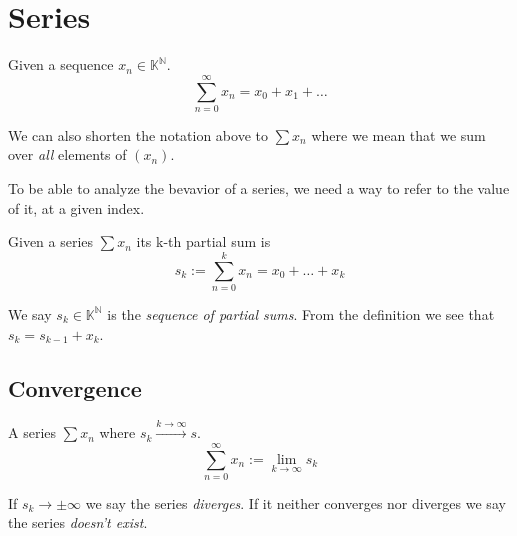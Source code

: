 \section{Series}
\begin{definition}[Series]
   Given a sequence \(x_n \in \mathbb{K}^\mathbb{N}\).
   \[\sum_{n=0}^{\infty} x_n = x_0 + x_1 + \ldots\]
\end{definition}
\begin{remark}[Notation]
   We can also shorten the notation above to \(\sum x_n\) where we mean that we sum over \emph{all} elements of \((x_n)\).
\end{remark}
To be able to analyze the bevavior of a series, we need a way to refer to the value of it, at a given index.
\begin{definition}
   Given a series \(\sum x_n\) its k-th partial sum is
   \[s_k := \sum_{n = 0}^{k} x_n = x_0 + \ldots + x_k\]
\end{definition}
\begin{remark}[Terminology]
   We say \(s_k \in \mathbb{K}^\mathbb{N}\) is the \emph{sequence of partial sums}.
   From the definition we see that \(s_k =  s_{k-1} + x_k\).
\end{remark}

\subsection{Convergence}
\begin{definition}\label{def:series_convergence}
   A series \(\sum x_n\) where \(s_k \xrightarrow{k \to \infty} s\).
   \[\sum_{n=0}^{\infty} x_n := \lim_{k \to \infty} s_k\]
\end{definition}
\begin{remark}[Terminology]
   If \(s_k \to \pm\infty\) we say the series \emph{diverges}.
   If it neither converges nor diverges we say the series \emph{doesn't exist}.
\end{remark}

